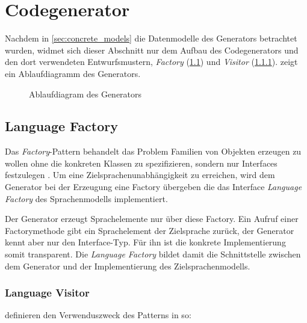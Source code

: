 \section{Codegenerator}
\label{sec:codegenerator}

Nachdem in \cref{sec:concrete_models} die Datenmodelle des Generators betrachtet wurden, widmet sich dieser Abschnitt nur dem Aufbau des Codegenerators und den dort verwendeten Entwurfsmustern, \emph{Factory} (\cref{sec:language_factory}) und \emph{Visitor} (\cref{sec:language_visitor}).  zeigt ein Ablaufdiagramm des Generators.

\begin{sidewaysfigure}
    \centering
    \resizebox{ \textwidth}{!}{
        
    } 
    \caption{Ablaufdiagram des Generators}
    \label{fig:generation_process}
\end{sidewaysfigure}

\subsection{Language Factory}
\label{sec:language_factory}

Das \emph{Factory}-Pattern behandelt das Problem Familien von Objekten erzeugen zu wollen ohne die konkreten Klassen zu spezifizieren, sondern nur Interfaces festzulegen \cite[][S. 26]{patternsKompakt}.
Um eine Zielsprachenunabhängigkeit zu erreichen, wird dem Generator bei der Erzeugung eine Factory übergeben die das Interface \emph{Language Factory} des Sprachenmodells implementiert. 

Der Generator erzeugt Sprachelemente nur über diese Factory. Ein Aufruf einer Factorymethode gibt ein Sprachelement der Zielsprache zurück, der Generator kennt aber nur den Interface-Typ. Für ihn ist die konkrete Implementierung somit transparent. 
Die \emph{Language Factory} bildet damit die Schnittstelle zwischen dem Generator und der Implementierung des Zielsprachenmodells.

\subsubsection{Language Visitor}
\label{sec:language_visitor}

\citeauthor{patternsKompakt} definieren den Verwenduszweck des Patterns in \cite[][S. 60]{patternsKompakt} so: 

